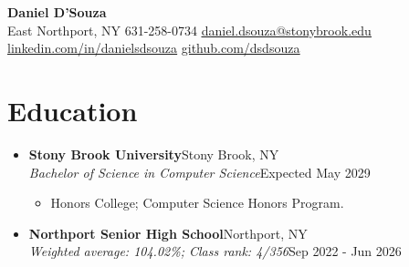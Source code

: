 \documentclass[letterpaper,11pt]{article}
\newcommand{\resumeItem}[1]{
  \item\small{
    {#1}
  }
}
\newcommand{\pdfspace}{\mbox{\textcolor{white}{\char32}}}
\newcommand{\resumeSubheading}[4]{
  \vspace{-2pt}\item
    \textbf{#1}\hfill\pdfspace {\small #2}\\
    {\small\textit{#3}\hfill\pdfspace #4}\par\vspace{-2pt}
}
\newcommand{\resumeSubHeadingListStart}{\begin{itemize}[leftmargin=0.15in,label={},topsep=2pt,itemsep=2pt,parsep=0pt]}
\newcommand{\resumeSubHeadingListEnd}{\end{itemize}}
\newcommand{\resumeItemListStart}{\begin{itemize}[topsep=2pt,itemsep=1pt,parsep=0pt]}
\newcommand{\resumeItemListEnd}{\end{itemize}\vspace{-5pt}}
\begin{document}
\begin{center}
  \textbf{\Huge Daniel D'Souza} \\ \vspace{2pt}
  \small East Northport, NY \textbar{} 631-258-0734 \textbar{}
  \href{mailto:daniel.dsouza@stonybrook.edu}{\underline{daniel.dsouza@stonybrook.edu}} \\
  \href{https://linkedin.com/in/danielsdsouza}{\underline{linkedin.com/in/danielsdsouza}} \textbar{}
  \href{https://github.com/dsdsouza}{\underline{github.com/dsdsouza}}
\end{center}

\section{Education}
\resumeSubHeadingListStart
  \resumeSubheading{Stony Brook University}{Stony Brook, NY}
    {Bachelor of Science in Computer Science}{Expected May 2029}
    \resumeItemListStart
      \resumeItem{Honors College; Computer Science Honors Program.}
    \resumeItemListEnd
  \resumeSubheading{Northport Senior High School}{Northport, NY}
    {Weighted average: 104.02\%; Class rank: 4/356}{Sep 2022 - Jun 2026}
\resumeSubHeadingListEnd
\end{document}
